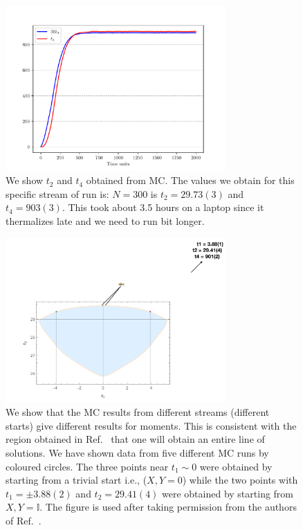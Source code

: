 \documentclass[11pt]{article}
\begin{document}
\begin{figure}[htbp] 
	\centering 
	\includegraphics[width=0.75\textwidth]{figs/2MM_symb_t2_t4.pdf}
	\caption{\label{fig:2MM_t2t4}We show $t_{2}$ and $t_{4}$ obtained from MC. 
	The values we obtain for this specific stream of run is: $N=300$ is $t_{2} = 29.73(3)$ and $t_{4} = 903(3)$. 
	This took about 3.5 hours on a laptop since it thermalizes late and we need to run bit longer.}
\end{figure}

\begin{figure}[h] 
	\centering 
	\includegraphics[width=0.75\textwidth]{figs/2MM_symb_ms.pdf}
	\caption{\label{fig:2MM_comp1}We show that the MC results from different streams (different starts) give different results for moments. This is consistent with the region obtained in Ref.~\cite{Kazakov:2021lel} that one will obtain an entire line of solutions. We have shown data from five different MC runs by coloured circles. The three points near $t_{1} \sim 0$ were obtained by starting from a trivial start i.e., ($X,Y = 0$) while the two points with $t_{1} = \pm 3.88(2)$ and $t_{2}=29.41(4)$ were obtained by starting from $X,Y = \mathbb{I}$. The figure is used after taking permission from the authors of Ref.~\cite{Kazakov:2021lel}.}
\end{figure}
\end{document}
